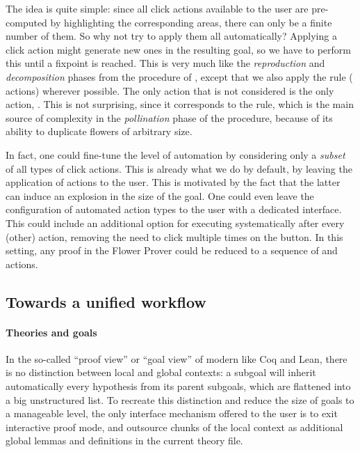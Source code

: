 The idea is quite simple: since all click actions available to the user are
pre-computed by highlighting the corresponding areas, there can only be a finite
number of them. So why not try to apply them all automatically? Applying a click
action might generate new ones in the resulting goal, so we have to perform this
until a fixpoint is reached. This is very much like the \emph{reproduction} and
\emph{decomposition} phases from the  procedure of
, except that we also apply the  rule
( actions) wherever possible. The only \Proof action that is not
considered is the only  action, . This is not surprising,
since it corresponds to the  rule, which is the main source of
complexity in the \emph{pollination} phase of the  procedure,
because of its ability to duplicate flowers of arbitrary size.

In fact, one could fine-tune the level of automation by considering only a
\emph{subset} of all types of click actions. This is already what we do by
default, by leaving the application of  actions to the user. This
is motivated by the fact that the latter can induce an explosion in the size of
the goal. One could even leave the configuration of automated action types to
the user with a dedicated interface. This could include an additional option for
executing  systematically after every (other) \Proof action,
removing the need to click multiple times on the  button. In this
setting, any proof in the Flower Prover could be reduced to a sequence of
 and  actions.


\subsection{Towards a unified workflow}

\paragraph{Theories and goals}

In the so-called ``proof view'' or ``goal view'' of modern  like
Coq and Lean, there is no distinction between local and global contexts: a
subgoal will inherit automatically every hypothesis from its parent subgoals,
which are flattened into a big unstructured list. To recreate this distinction
and reduce the size of goals to a manageable level, the only interface mechanism
offered to the user is to exit interactive proof mode, and outsource chunks of
the local context as additional global lemmas and definitions in the current
theory file.

